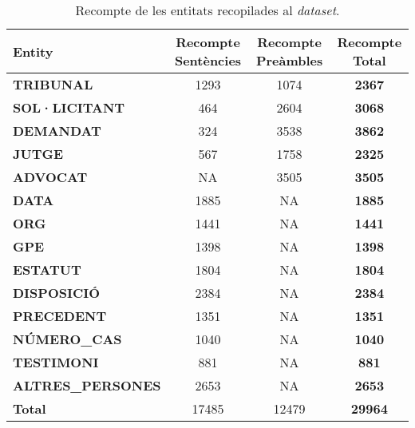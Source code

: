 \begin{table}[H]
    \centering
    \begin{tabular}{lccc}
        \toprule
        Entity & Recompte Sentències & Recompte Preàmbles & Recompte Total \\
        \midrule
        \textbf{TRIBUNAL} & 1293 & 1074 & \textbf{2367} \\
        \textbf{SOL·LICITANT} & 464 & 2604 & \textbf{3068} \\
        \textbf{DEMANDAT} & 324 & 3538 & \textbf{3862} \\
        \textbf{JUTGE} & 567 & 1758 & \textbf{2325} \\
        \textbf{ADVOCAT} & NA & 3505 & \textbf{3505} \\
        \textbf{DATA} & 1885 & NA & \textbf{1885} \\
        \textbf{ORG} & 1441 & NA & \textbf{1441} \\
        \textbf{GPE} & 1398 & NA & \textbf{1398} \\
        \textbf{ESTATUT} & 1804 & NA & \textbf{1804} \\
        \textbf{DISPOSICIÓ} & 2384 & NA & \textbf{2384} \\
        \textbf{PRECEDENT} & 1351 & NA & \textbf{1351} \\
        \textbf{NÚMERO\_CAS} & 1040 & NA & \textbf{1040} \\
        \textbf{TESTIMONI} & 881 & NA & \textbf{881} \\
        \textbf{ALTRES\_PERSONES} & 2653 & NA & \textbf{2653} \\
        \midrule
        \textbf{Total} & 17485 & 12479 & \textbf{29964} \\
        \bottomrule
    \end{tabular}
    \caption{Recompte de les entitats recopilades al \textit{dataset}.}
    \label{tab:entity_counts}
\end{table}


